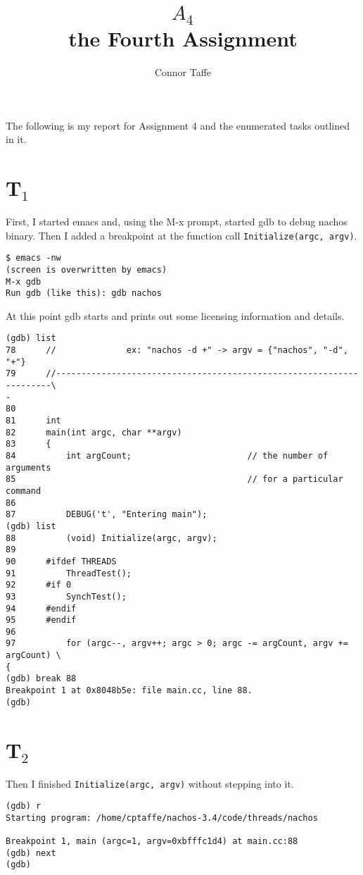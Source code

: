 \documentclass[letterpaper, 10pt]{article}
\title{
	$A_4$\\
	{\large the Fourth Assignment}
}
\author{Connor Taffe}
\begin{document}
	\maketitle

	The following is my report for Assignment 4 and the enumerated tasks outlined in it.

	\section*{T$_1$}

	First, I started emacs and, using the M-x prompt, started gdb to debug nachos binary. Then I added a breakpoint at the function call {\tt Initialize(argc, argv)}.

	\begin{verbatim}
$ emacs -nw
(screen is overwritten by emacs)
M-x gdb
Run gdb (like this): gdb nachos
	\end{verbatim}

	At this point gdb starts and prints out some licensing information and details.

	\begin{verbatim}
(gdb) list
78      //              ex: "nachos -d +" -> argv = {"nachos", "-d", "+"}
79      //---------------------------------------------------------------------\
-
80
81      int
82      main(int argc, char **argv)
83      {
84          int argCount;                       // the number of arguments
85                                              // for a particular command
86
87          DEBUG('t', "Entering main");
(gdb) list
88          (void) Initialize(argc, argv);
89
90      #ifdef THREADS
91          ThreadTest();
92      #if 0
93          SynchTest();
94      #endif
95      #endif
96
97          for (argc--, argv++; argc > 0; argc -= argCount, argv += argCount) \
{
(gdb) break 88
Breakpoint 1 at 0x8048b5e: file main.cc, line 88.
(gdb)
	\end{verbatim}

	\section*{T$_2$}

	Then I finished {\tt Initialize(argc, argv)} without stepping into it.

	\begin{verbatim}
(gdb) r
Starting program: /home/cptaffe/nachos-3.4/code/threads/nachos

Breakpoint 1, main (argc=1, argv=0xbfffc1d4) at main.cc:88
(gdb) next
(gdb)
	\end{verbatim}
\end{document}
